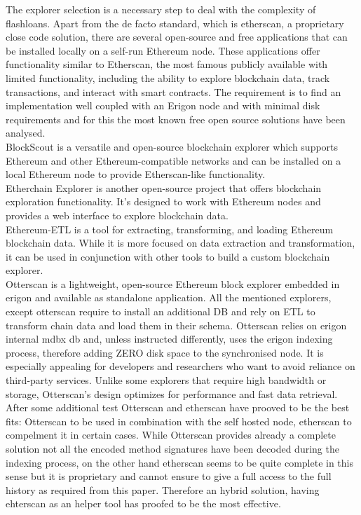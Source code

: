 \documentclass[11pt,a4paper,titlepage]{scrartcl}
\begin{document}
The explorer selection is a necessary step to deal with the complexity of flashloans. Apart from the de facto standard, which is etherscan, a proprietary close code solution, there are several open-source and free applications that can be installed locally on a self-run Ethereum node. These applications offer functionality similar to Etherscan, the most famous publicly available with limited functionality, including the ability to explore blockchain data, track transactions, and interact with smart contracts. The requirement is to find an implementation well coupled with an Erigon node and with minimal disk requirements and for this  the most known free open source solutions have been analysed.  \\
BlockScout is a versatile and open-source blockchain explorer which supports Ethereum and other Ethereum-compatible networks and can be installed on a local Ethereum node to provide Etherscan-like functionality. \\
Etherchain Explorer is another open-source project that offers blockchain exploration functionality. It's designed to work with Ethereum nodes and provides a web interface to explore blockchain data. \\
Ethereum-ETL is a tool for extracting, transforming, and loading Ethereum blockchain data. While it is more focused on data extraction and transformation, it can be used in conjunction with other tools to build a custom blockchain explorer. \\
Otterscan is a lightweight, open-source Ethereum block explorer embedded in erigon and available as standalone application. All the mentioned explorers, except otterscan require to install an additional DB and rely on ETL to transform chain data and load them in their schema. Otterscan relies on erigon internal mdbx db and, unless instructed differently, uses the erigon indexing process, therefore adding ZERO disk space to the synchronised node. It is especially appealing for developers and researchers who want to avoid reliance on third-party services. Unlike some explorers that require high bandwidth or storage, Otterscan’s design optimizes for performance and fast data retrieval.\\
After some additional test Otterscan and etherscan have prooved to be the best fits: Otterscan to be used in combination with the self hosted node, etherscan to compelment it in certain cases. While Otterscan provides already a complete solution not all the encoded method signatures have been  decoded during the indexing process, on the other hand etherscan seems to be quite complete in this sense but it is proprietary and cannot ensure to give a full access to the full history as required from this paper. Therefore an hybrid solution, having ehterscan as an helper tool has proofed to be the most effective.
\end{document}
